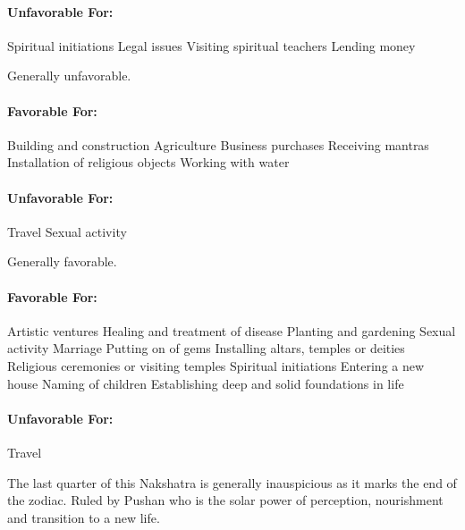 \paragraph{Unfavorable For:}

Spiritual initiations
Legal issues
Visiting spiritual teachers
Lending money
 


Generally unfavorable.

 

\paragraph{Favorable For:}

Building and construction
Agriculture
Business purchases
Receiving mantras
Installation of religious objects
Working with water
 

\paragraph{Unfavorable For:}

Travel
Sexual activity
 


Generally favorable.

 

\paragraph{Favorable For:}

Artistic ventures
Healing and treatment of disease
Planting and gardening
Sexual activity
Marriage
Putting on of gems
Installing altars, temples or deities
Religious ceremonies or visiting temples
Spiritual initiations
Entering a new house
Naming of children
Establishing deep and solid foundations in life
 

\paragraph{Unfavorable For:}

Travel
 


The last quarter of this Nakshatra is generally inauspicious as it marks the end of the zodiac. Ruled by Pushan who is the solar power of perception, nourishment and transition to a new life.

